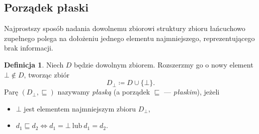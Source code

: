 \documentclass[11pt,a4paper]{article}
\theoremstyle{definition}
\newtheorem{definicja}{Definicja}[section]
\theoremstyle{plain}
\newcommand{\bt}{\bot}                            %
\begin{document}

%
\subsection{Porządek płaski}

Najprostszy sposób nadania dowolnemu zbiorowi struktury zbioru łańcuchowo
zupełnego polega na dołożeniu jednego elementu najmniejszego, reprezentującego
brak informacji.

\begin{definicja}\label{def:zbior_plaski}
	Niech $D$ będzie dowolnym zbiorem. Rozszerzmy go o nowy element
	$\bt\notin D$, tworząc zbiór
	\[
	D_\bt \coloneqq  D \cup \{\bt\}.
	\]
	Parę $(D_\bt,\sqsubseteq)$ nazywamy \emph{płaską} (a porządek
	$\sqsubseteq$ --- \emph{płaskim}), jeżeli
	\begin{itemize}
		\item [(1)] $\bt$ jest elementem najmniejszym zbioru $D_\bt$,
		\item [(2)] $d_1 \sqsubseteq d_2 \iff d_1 = \bt \ \text{lub}\ d_1 = d_2$.
	\end{itemize}
\end{definicja}
\end{document}
